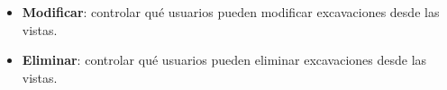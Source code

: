 \begin{itemize}

        \item \textbf{Modificar}: controlar qué usuarios pueden modificar excavaciones
        desde las vistas.
        
    
    
    
    

        \item \textbf{Eliminar}: controlar qué usuarios pueden eliminar excavaciones
        desde las vistas.
    
    
    \end{itemize}

